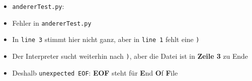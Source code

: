 \begin{frame}
    \slidehead
    \begin{itemize}
        \item \texttt{andererTest.py}:
            \pause
            \pause
        \item Fehler in \texttt{andererTest.py}
            \pause
        \item In \texttt{line 3} stimmt hier nicht ganz, aber in \texttt{line 1} fehlt eine \texttt{)}
            \pause
        \item Der Interpreter sucht weiterhin nach \texttt{)}, aber die Datei ist in \textbf{Zeile 3} zu Ende
            \pause
        \item Deshalb \texttt{unexpected EOF}: \textbf{EOF} steht für \textbf{E}nd \textbf{O}f \textbf{F}ile
    \end{itemize}
\end{frame}

\subsection{}
\livecoding




